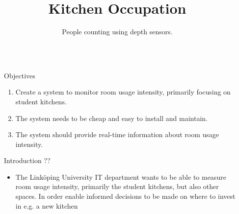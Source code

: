 \documentclass[final,hyperref={pdfpagelabels=false}]{beamer}
\title{\huge Kitchen Occupation} %
\author{People counting using depth sensors.} %
\institute{Department of Electrical Engineering, Link\"{o}öping University} %
\begin{document}

\begin{frame}[t] %

\begin{columns}[t] %

\begin{column}{.02\textwidth}\end{column} %

\begin{column}{.465\textwidth} %


\begin{block}{Objectives}

\begin{enumerate}
\item Create a system to monitor room usage intensity, primarily focusing on student kitchens.
\item The system needs to be cheap and easy to install and maintain.
\item The system should provide real-time information about room usage intensity.
\end{enumerate}

\end{block}

            
\begin{block}{Introduction ??}

\begin{itemize}
\item The Linköping University IT department wants to be able to measure room usage intensity, primarily the student kitchens, but also other spaces. In order enable informed decisions to be made on where to invest in e.g. a new kitchen
\end{itemize}


\end{block}
\end{column}
\end{columns}
\end{frame}
\end{document}
